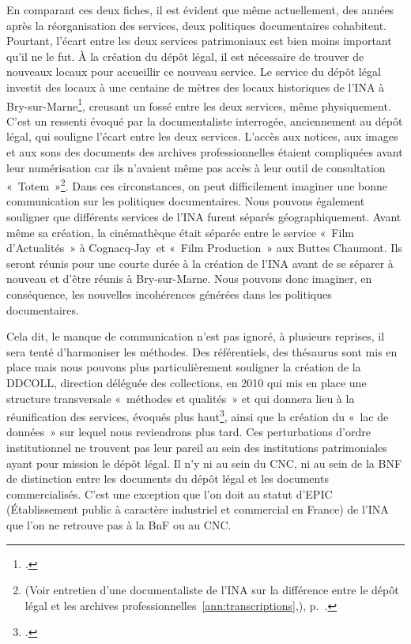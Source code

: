 En comparant ces deux fiches, il est évident que même actuellement, des années après la réorganisation des services, deux politiques documentaires cohabitent. Pourtant, l’écart entre les deux services patrimoniaux est bien moins important qu’il ne le fut. À la création du dépôt légal, il est nécessaire de trouver de nouveaux locaux pour accueillir ce nouveau service. Le service du dépôt légal investit des locaux à une centaine de mètres des locaux historiques de l’INA à Bry-sur-Marne\footcite[][24]{varra2023}, creusant un fossé entre les deux services, même physiquement. C’est un ressenti évoqué par la documentaliste interrogée, anciennement au dépôt légal, qui souligne l’écart entre les deux services. L’accès aux notices, aux images et aux sons des documents des archives professionnelles étaient compliquées avant leur numérisation car ils n’avaient même pas accès à leur outil de consultation « Totem »\footnote{(Voir entretien d'une documentaliste de l'INA sur la différence entre le dépôt légal et les archives professionnelles~\ref{ann:transcriptions},), p.~\pageref{ann:transcriptions}.}. Dans ces circonstances, on peut difficilement imaginer une bonne communication sur les politiques documentaires. Nous pouvons également souligner que différents services de l’INA furent séparés géographiquement. Avant même sa création, la cinémathèque était séparée entre le service « Film d’Actualités » à Cognacq-Jay et « Film Production » aux Buttes Chaumont. Ils seront réunis pour une courte durée à la création de l’INA avant de se séparer à nouveau et d’être réunis à Bry-sur-Marne. Nous pouvons donc imaginer, en conséquence, les nouvelles incohérences générées dans les politiques documentaires. 

Cela dit, le manque de communication n’est pas ignoré, à plusieurs reprises, il sera tenté d'harmoniser les méthodes. Des référentiels, des thésaurus sont mis en place mais nous pouvons plus particulièrement souligner la création de la DDCOLL, direction déléguée des collections, en 2010 qui mis en place une structure transversale « méthodes et qualités » et qui donnera lieu à la réunification des services, évoqués plus haut\footcite[][29]{varra2023}, ainsi que la création du « lac de données » sur lequel nous reviendrons plus tard. 
Ces perturbations d’ordre institutionnel ne trouvent pas leur pareil au sein des institutions patrimoniales ayant pour mission le dépôt légal. Il n’y ni au sein du CNC, ni au sein de la BNF de distinction entre les documents du dépôt légal et les documents commercialisés. C’est une exception que l’on doit au statut d’EPIC (Établissement public à caractère industriel et commercial en France) de l’INA que l'on ne retrouve pas à la BnF ou au CNC. 